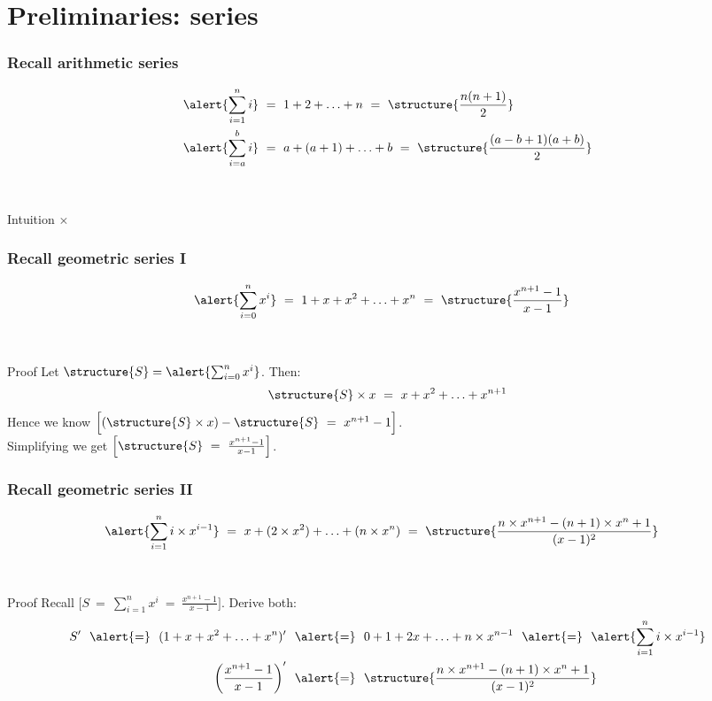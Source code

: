 \documentclass[aspectratio=169]{beamer}
\begin{document}
\section{Preliminaries: series}


\begin{frame}\frametitle{Recall arithmetic series}
    
\begin{align*}
  \alert{\sum_{i=1}^n i} &~=~ 1 + 2 + \ldots + n ~=~ \structure{\frac{n(n+1)}{2}}
  \\
  \alert{\sum_{i=a}^b i} &~=~ a + (a+1) + \ldots + b ~=~
    \structure{\frac{(a-b+1)(a+b)}{2}}
\end{align*}

~\\[8mm]

\begin{block}{Intuition}
\centering
{} $\times$   
\end{block}
\end{frame}

\begin{frame}\frametitle{Recall geometric series I} 
\begin{align*}
  \alert{\sum_{i=0}^n x^i} &~=~ 1 + x + x^2 + \ldots + x^n ~=~
      \structure{\frac{x^{n+1}-1}{x-1}}
\end{align*}

~\\[2mm]

\begin{block}{Proof}
\centering
Let $\structure{S}=\alert{\sum_{i=0}^n x^i}$. Then:
$$\structure{S}\times x ~=~ x + x^2 + \ldots + x^{n+1}$$
Hence we know $\Big[(\structure{S}\times x)-\structure{S} ~=~ x^{n+1}-1\Big]$.
\\
Simplifying we get $\Big[\structure{S} ~=~ \frac{x^{n+1}-1}{x-1}\Big]$.
\end{block}
\end{frame}

\begin{frame}\frametitle{Recall geometric series II}
\begin{align*}
  \alert{\sum_{i=1}^n i \times x^{i-1}} &~=~ x + (2\times x^2) + \ldots + (n\times x^n) ~=~
      \structure{\frac{n\times x^{n+1}-(n+1)\times x^n +1}{(x-1)^2}}
\end{align*}

~\\[2mm]

\begin{block}{Proof}
\centering
Recall $\Big[S ~=~ \sum_{i=1}^n x^i ~=~ \frac{x^{n+1}-1}{x-1}\Big]$.
Derive both:
\begin{align*}
 S'
   ~~\alert{=}~~ (1 + x + x^2 + \ldots + x^n)'
  &~~\alert{=}~~ 0 + 1 + 2x + \ldots + n\times x^{n-1}
   ~~\alert{=}~~\alert{\sum_{i=1}^n i \times x^{i-1}}
\\
\left(\frac{x^{n+1}-1}{x-1}\right)'
  &~~\alert{=}~~
   \structure{\frac{n\times x^{n+1}-(n+1)\times x^n +1}{(x-1)^2}}
\end{align*}
\end{block}
\end{frame}
\end{document}
